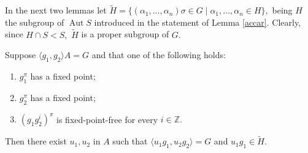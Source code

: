 \documentclass{amsart}
\DeclareMathOperator{\aut}{Aut}
\numberwithin{equation}{section}
\begin{document}
In the next two lemmas let $\tilde H=\{(\alpha_1,\dots,\alpha_n)\sigma \in G \mid \alpha_1,\dots,\alpha_n \in H\},$ being $H$ the subgroup of $\aut S$ introduced in the statement of Lemma \ref{accar}. Clearly, since $H\cap S < S,$ $\tilde H$ is a proper subgroup of $G.$

\begin{lemma}\label{brutto}
	Suppose $\langle g_1, g_2 \rangle A=G$ and that one of the following holds:
	\begin{enumerate}
		\item $g_1^\pi$ has a fixed point;
		\item $g_2^\pi$ has a fixed point;
	\item $(g_1g_2^i)^\pi$ is fixed-point-free for every $i \in \mathbb Z.$
	\end{enumerate}
Then there exist $u_1, u_2$ in $A$ such that $\langle u_1g_1, u_2g_2 \rangle=G$ and $u_1g_1 \in \tilde H$.
\end{lemma}
\end{document}
